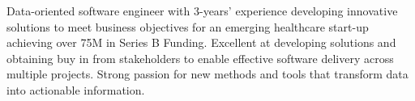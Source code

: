 

\begin{cvparagraph}


Data-oriented software engineer with 3-years’ experience developing innovative solutions to meet business objectives for an emerging healthcare start-up achieving over 75M in Series B Funding. Excellent at developing solutions and obtaining buy in from stakeholders to enable effective software delivery across multiple projects. Strong passion for new methods and tools that transform data into actionable information.
\end{cvparagraph}
